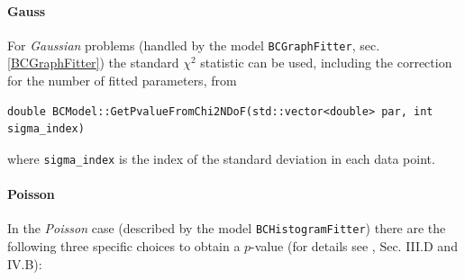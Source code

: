 \documentclass[11pt, a4paper]{article}
\begin{document}
\paragraph{Gauss} For \textit{Gaussian} problems (handled by the model
\verb|BCGraphFitter|, sec. \ref{BCGraphFitter}) the standard $\chi^2$
statistic can be used, including the correction for the number of
fitted parameters, from
%
\begin{verbatim}
double BCModel::GetPvalueFromChi2NDoF(std::vector<double> par, int sigma_index)
\end{verbatim}
%
where \verb|sigma_index| is the index of the standard deviation in
each data point.

\paragraph{Poisson}In the \textit{Poisson} case (described by the model \verb|BCHistogramFitter|)
there are the following three
specific choices to obtain a $p$-value
(for details see \cite{BAT_pValue}, Sec. III.D and IV.B):
\end{document}
